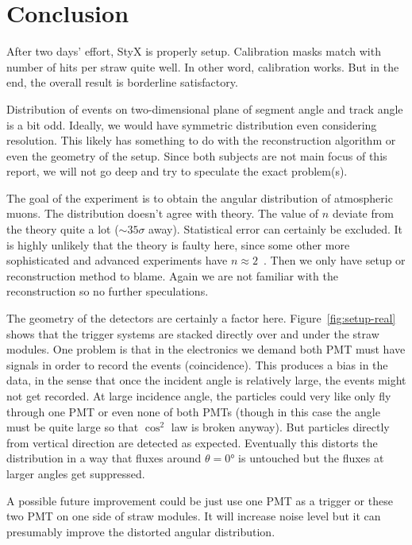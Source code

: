 
\section{Conclusion}\label{sec:con}
After two days' effort, StyX is properly setup. Calibration masks match with number of hits per straw quite well. In other word, calibration works. But in the end, the overall result is borderline satisfactory. 

Distribution of events on two-dimensional plane of segment angle and track angle is a bit odd. Ideally, we would have symmetric distribution even considering resolution. This likely has something to do with the reconstruction algorithm or even the geometry of the setup. Since both subjects are not main focus of this report, we will not go deep and try to speculate the exact problem(s).

The goal of the experiment is to obtain the angular distribution of atmospheric muons. The distribution doesn't agree with theory. The value of $n$ deviate from the theory quite a lot ($\sim 35\sigma$ away). Statistical error can certainly be excluded. It is highly unlikely that the theory is faulty here, since some other more sophisticated and advanced experiments have $n\approx2$~\cite{BAHMANABADI20191}\cite{Shukla}. Then we only have setup or reconstruction method to blame. Again we are not familiar with the reconstruction so no further speculations. 

The geometry of the detectors are certainly a factor here. Figure~\ref{fig:setup-real} shows that the trigger systems are stacked directly over and under the straw modules. One problem is that in the electronics we demand both PMT must have signals in order to record the events (coincidence). This produces a bias in the data, in the sense that once the incident angle is relatively large, the events might not get recorded. At large incidence angle, the particles could very like only fly through one PMT or even none of both PMTs (though in this case the angle must be quite large so that $\cos^2$ law is broken anyway). But particles directly from vertical direction are detected as expected. Eventually this distorts the distribution in a way that fluxes around $\theta=\ang{0}$ is untouched but the fluxes at larger angles get suppressed.

A possible future improvement could be just use one PMT as a trigger or these two PMT on one side of straw modules. It will increase noise level but it can presumably improve the distorted angular distribution. 
